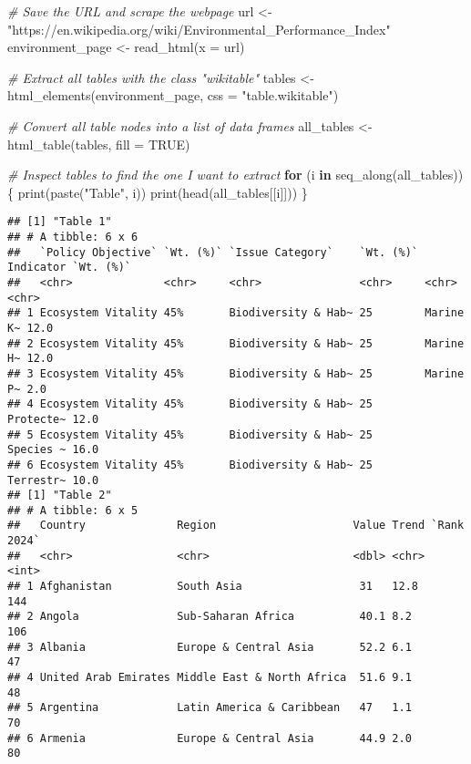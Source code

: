\documentclass[
]{article}
\newenvironment{Shaded}{\begin{snugshade}}{\end{snugshade}}
\newcommand{\AttributeTok}[1]{\textcolor[rgb]{0.77,0.63,0.00}{#1}}
\newcommand{\CommentTok}[1]{\textcolor[rgb]{0.56,0.35,0.01}{\textit{#1}}}
\newcommand{\ConstantTok}[1]{\textcolor[rgb]{0.00,0.00,0.00}{#1}}
\newcommand{\ControlFlowTok}[1]{\textcolor[rgb]{0.13,0.29,0.53}{\textbf{#1}}}
\newcommand{\FunctionTok}[1]{\textcolor[rgb]{0.00,0.00,0.00}{#1}}
\newcommand{\NormalTok}[1]{#1}
\newcommand{\OtherTok}[1]{\textcolor[rgb]{0.56,0.35,0.01}{#1}}
\newcommand{\StringTok}[1]{\textcolor[rgb]{0.31,0.60,0.02}{#1}}
\begin{document}
\begin{Shaded}
\begin{Highlighting}[]
\CommentTok{\# Save the URL and scrape the webpage}
\NormalTok{url }\OtherTok{\textless{}{-}} \StringTok{"https://en.wikipedia.org/wiki/Environmental\_Performance\_Index"}
\NormalTok{environment\_page }\OtherTok{\textless{}{-}} \FunctionTok{read\_html}\NormalTok{(}\AttributeTok{x =}\NormalTok{ url)}

\CommentTok{\# Extract all tables with the class "wikitable"}
\NormalTok{tables }\OtherTok{\textless{}{-}} \FunctionTok{html\_elements}\NormalTok{(environment\_page, }\AttributeTok{css =} \StringTok{"table.wikitable"}\NormalTok{)}

\CommentTok{\# Convert all table nodes into a list of data frames}
\NormalTok{all\_tables }\OtherTok{\textless{}{-}} \FunctionTok{html\_table}\NormalTok{(tables, }\AttributeTok{fill =} \ConstantTok{TRUE}\NormalTok{)}

\CommentTok{\# Inspect tables to find the one I want to extract}
\ControlFlowTok{for}\NormalTok{ (i }\ControlFlowTok{in} \FunctionTok{seq\_along}\NormalTok{(all\_tables)) \{}
  \FunctionTok{print}\NormalTok{(}\FunctionTok{paste}\NormalTok{(}\StringTok{"Table"}\NormalTok{, i))}
  \FunctionTok{print}\NormalTok{(}\FunctionTok{head}\NormalTok{(all\_tables[[i]]))}
\NormalTok{\}}
\end{Highlighting}
\end{Shaded}

\begin{verbatim}
## [1] "Table 1"
## # A tibble: 6 x 6
##   `Policy Objective` `Wt. (%)` `Issue Category`    `Wt. (%)` Indicator `Wt. (%)`
##   <chr>              <chr>     <chr>               <chr>     <chr>     <chr>    
## 1 Ecosystem Vitality 45%       Biodiversity & Hab~ 25        Marine K~ 12.0     
## 2 Ecosystem Vitality 45%       Biodiversity & Hab~ 25        Marine H~ 12.0     
## 3 Ecosystem Vitality 45%       Biodiversity & Hab~ 25        Marine P~ 2.0      
## 4 Ecosystem Vitality 45%       Biodiversity & Hab~ 25        Protecte~ 12.0     
## 5 Ecosystem Vitality 45%       Biodiversity & Hab~ 25        Species ~ 16.0     
## 6 Ecosystem Vitality 45%       Biodiversity & Hab~ 25        Terrestr~ 10.0     
## [1] "Table 2"
## # A tibble: 6 x 5
##   Country              Region                     Value Trend `Rank 2024`
##   <chr>                <chr>                      <dbl> <chr>       <int>
## 1 Afghanistan          South Asia                  31   12.8          144
## 2 Angola               Sub-Saharan Africa          40.1 8.2           106
## 3 Albania              Europe & Central Asia       52.2 6.1            47
## 4 United Arab Emirates Middle East & North Africa  51.6 9.1            48
## 5 Argentina            Latin America & Caribbean   47   1.1            70
## 6 Armenia              Europe & Central Asia       44.9 2.0            80
\end{verbatim}
\end{document}
